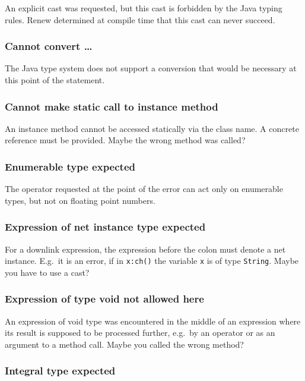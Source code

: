 An explicit cast was requested, but this cast
is forbidden by the Java typing rules.
Renew determined at compile time that this cast
can never succeed.

\subsubsection{Cannot convert \dots}

The Java type system does not support a conversion that would
be necessary at this point of the statement.

\subsubsection{Cannot make static call to instance method}

An instance method cannot be accessed statically
via the class name. A concrete reference must be provided.
Maybe the wrong method was called?

\subsubsection{Enumerable type expected}

The operator requested at the point of the error
can act only on enumerable types, but not on
floating point numbers.

\subsubsection{Expression of net instance type expected}

For a downlink expression, the expression before the colon must
denote a net instance. E.g.\ it is an error, if in \texttt{x:ch()} the
variable \texttt{x} is of type \texttt{String}.
Maybe you have to use a cast?

\subsubsection{Expression of type void not allowed here}

An expression of void type was encountered in the middle
of an expression where its result is supposed to be
processed further, e.g.\ by an operator or as an argument
to a method call. Maybe you called the wrong method?

\subsubsection{Integral type expected}

